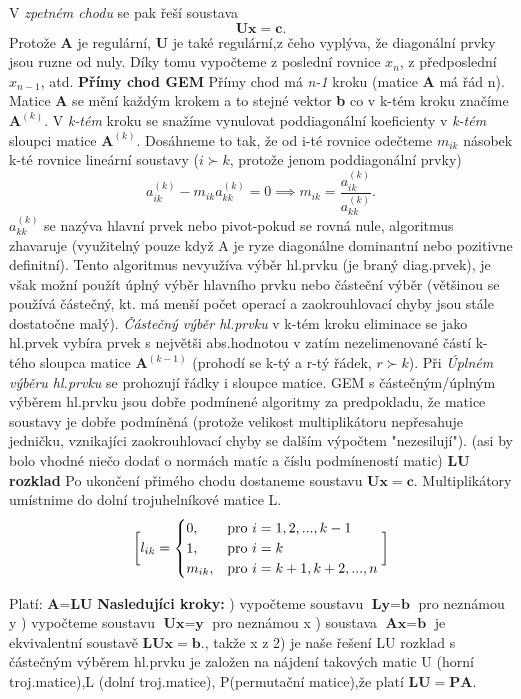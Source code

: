\documentclass[a4]{report}
\theoremstyle{definition}
\begin{document}
{V \textit{zpetném chodu} se pak řeší soustava $$\textbf{Ux}=\textbf{c}.$$ Protože \textbf{A} je regulární, \textbf{U} je také regulární,z čeho vyplýva, že diagonální prvky jsou ruzne od nuly. Díky tomu vypočteme z poslední rovnice $x_{n}$, z předposlední $x_{n-1}$, atd.
\textbf{Přímy chod GEM}
Přímy chod má \textit{n-1} kroku (matice \textbf{A} má řád n). Matice \textbf{A} se mění každým krokem a to stejné vektor \textbf{b} co v k-tém kroku značíme $\textbf{A}^{(k)}$. V \textit{k-tém} kroku se snažíme vynulovat poddiagonální koeficienty v \textit{k-tém} sloupci matice $\textbf{A}^{(k)}$. Dosáhneme to tak, že od i-té rovnice odečteme $\textit{m}_{ik}$ násobek k-té rovnice lineární soustavy ($i\succ k$, protože jenom poddiagonální prvky)
$$a_{ik}^{(k)}-m_{ik}a_{kk}^{(k)}=0 \implies m_{ik}=\frac{a_{ik}^{(k)}}{a_{kk}^{(k)}}.$$
$a_{kk}^{(k)}$ se nazýva hlavní prvek nebo pivot-pokud se rovná nule, algoritmus zhavaruje (využitelný pouze když A je ryze diagonálne dominantní nebo pozitivne definitní).
\newline Tento algoritmus nevyužíva výběr hl.prvku (je braný diag.prvek), je však možní použít úplný výběr hlavního prvku nebo částeční výběr (většinou se používá částečný, kt. má menší počet operací a zaokrouhlovací chyby jsou stále dostatočne malý).
\newline 
\textit{Částečný výběr hl.prvku} v k-tém kroku eliminace se jako hl.prvek vybíra prvek s největši abs.hodnotou v zatím nezelimenované částí k-tého sloupca matice $\textbf{A}^{(k-1)}$ (prohodí se k-tý a r-tý řádek, $r\succ k$). Při \textit{Úplném výběru hl.prvku} se prohozují řádky i sloupce matice.
\newline GEM s částečným/úplným výběrem hl.prvku jsou dobře podmínené algoritmy za predpokladu, že matice soustavy je dobře podmíněná (protože velikost multiplikátoru nepřesahuje jedničku, vznikajíci zaokrouhlovací chyby se dalším výpočtem "nezesilují"). (asi by bolo vhodné niečo dodať o normách matíc a číslu podmíneností matic)
\textbf{LU rozklad}
Po ukončení přimého chodu dostaneme soustavu $\textbf{Ux}=\textbf{c}.$ Multiplikátory umístnime do dolní trojuhelníkové matice L.
$$
\bigg{[} l_{ik}= 
\begin{cases}
       0, & \text{pro } i=1,2,...,k-1 \\
       1, & \text{pro } i=k \\
        m_{ik}, & \text{pro } i=k+1,k+2,...,n
\end{cases}
\bigg{]}
$$

Platí: \textbf{A}=\textbf{LU}
\newline \textbf{Nasledujíci kroky:}
) vypočteme soustavu $\textbf{Ly}=\textbf{b}$ pro neznámou y 
) vypočteme soustavu $\textbf{Ux}=\textbf{y}$ pro neznámou x
) soustava $\textbf{Ax}=\textbf{b}$ je ekvivalentní soustavě $\textbf{LUx}=\textbf{b}.$, takže x z 2) je naše řešení
\newline LU rozklad s částečným výběrem hl.prvku je založen na nájdení takových matic U (horní troj.matice),L (dolní troj.matice), P(permutační matice),že platí $\textbf{LU}=\textbf{PA}.$

}
\end{document}
